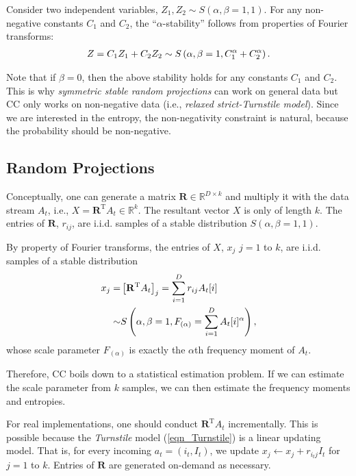 \documentclass{sig-alternate}
\begin{document}
Consider two independent variables, $Z_1, Z_2 \sim S(\alpha, \beta=1,1)$. For any non-negative constants $C_1$ and $C_2$, the ``$\alpha$-stability'' follows from  properties of Fourier transforms:
\begin{align}\notag
Z = C_1Z_1 + C_2Z_2 \sim S\left(\alpha, \beta=1, C_1^\alpha + C_2^\alpha\right).
\end{align}

Note that if $\beta = 0$, then the above stability holds for any constants $C_1$ and $C_2$. This is why {\em symmetric stable random projections}\cite{Article:Indyk_JACM06,Proc:Li_SODA08} can work on general data but CC only works on non-negative data  (i.e., {\em relaxed strict-Turnstile model}). Since we are interested in the entropy, the non-negativity constraint is natural, because the probability should be non-negative.

\subsection{Random Projections}

Conceptually, one can generate a  matrix $\mathbf{R}\in\mathbb{R}^{D\times k}$ and multiply it with the data stream $A_t$, i.e., $X = \mathbf{R}^\text{T} A_t \in\mathbb{R}^k$. The resultant vector $X$ is only of length $k$. The entries of $\mathbf{R}$, $r_{ij}$,  are i.i.d. samples of a stable distribution $S(\alpha,\beta=1,1)$.

By property of Fourier transforms, the entries of $X$, $x_j$ $j = 1$ to $k$,  are i.i.d. samples of a stable distribution
{\small\begin{align}\notag
x_j =& \left[\mathbf{R}^\text{T}A_t\right]_j = \sum_{i=1}^D r_{ij} A_t[i]\\
 \sim& S\left(\alpha,\beta=1,F_{(\alpha)} = \sum_{i=1}^D A_t[i]^\alpha\right),
\end{align}}
\noindent whose scale parameter $F_{(\alpha)}$ is exactly the $\alpha$th frequency moment of $A_t$.

Therefore, CC boils down to a statistical estimation problem. If we can estimate the scale parameter from $k$ samples, we can then estimate the frequency moments and  entropies.

For real implementations, one should conduct $\mathbf{R}^\text{T}A_t$ incrementally. This is possible because the {\em Turnstile} model (\ref{eqn_Turnstile}) is  a linear updating model. That is, for every incoming $a_t = (i_t, I_t)$, we update $x_j \leftarrow x_j + r_{i_tj} I_t$ for $j = 1$ to $k$.  Entries of $\mathbf{R}$ are generated on-demand as necessary.
\end{document}
